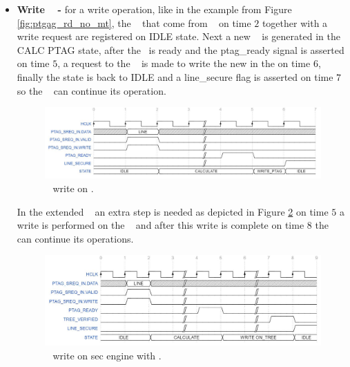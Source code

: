 \begin{itemize}
 \item{\textbf{Write \ptag~ - }} for a write operation, like in the example from  Figure \ref{fig:ptgag_rd_no_mt}, the \sline~ that  come from \handler~  on time $2$ together with a write request are registered on IDLE state.  Next a new \ptag~ is generated in the CALC PTAG state, after the \ptag~is ready and the ptag\_ready signal is asserted on time $5$, a request to the \pmmu~ is made  to write the new \ptag in the \ptagmem on time $6$, finally the state is back to IDLE  and a line\_secure flag is asserted on time $7$ so the \handler~ can continue its operation. 
   \begin{figure}[!ht]
    \centering
    \includegraphics[width=\textwidth]{figures/others/ptag_write_sec_eng.JPG}
    \caption{\ptag~ write  on \seceng.}
    \label{fig:se_pw_no_mt}
\end{figure}

In the extended \cshia~ an extra step is needed as depicted in Figure \ref{fig:se_pw_mt} on time $5$ a write is performed on the \mt~ and after this write is complete on time $8$ the \seceng~ can continue its operations. 

  \begin{figure}[!ht]
    \centering
    \includegraphics[width=\textwidth]{figures/others/ptag_write_tree_sec_eng.JPG}
    \caption{\ptag~ write  on sec engine with \mt.  }
    \label{fig:se_pw_mt}
\end{figure}
\end{itemize}







